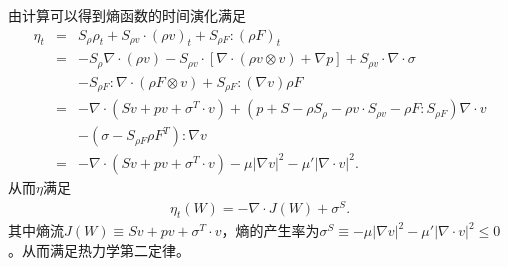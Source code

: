 \documentclass{article}
\begin{document}
由计算可以得到熵函数的时间演化满足
\begin{eqnarray}\label{eq:entropy}
  \eta_t  &=& S_\rho \rho_t + S_{\rho  v } \cdot (\rho  v )_t  + S_{\rho F} : (\rho F)_t \nonumber \\
  &=& -S_{\rho} \nabla \cdot (\rho  v )  - S_{\rho  v  } \cdot [\nabla \cdot (\rho  v \otimes v ) + \nabla p] + S_{\rho  v } \cdot \nabla \cdot \sigma \nonumber \\
    &&- S_{\rho F} : \nabla \cdot (\rho F\otimes  v  ) + S_{\rho F}:(\nabla   v ) \rho F \nonumber \\
    &=& - \nabla \cdot (S  v +p  v  +\sigma^T \cdot v ) + (p+S - \rho S_\rho - \rho  v  \cdot S_{\rho  v } - \rho F : S_{\rho F}) \nabla \cdot  v  \nonumber \\
    &&- (\sigma - S_{\rho F} \rho F^T) : \nabla  v \nonumber \\
    &=& - \nabla \cdot (S  v +p  v  +\sigma^T \cdot v ) - \mu|\nabla  v |^2 - \mu'|\nabla\cdot v |^2.
\end{eqnarray}
从而$\eta$满足
\begin{eqnarray}\label{eq:entropyvol}
  \eta_t(W) = -\nabla\cdot J(W) + \sigma^S.
\end{eqnarray}
其中熵流$J(W)\equiv S  v +p  v  +\sigma^T \cdot v $，熵的产生率为$\sigma^S \equiv - \mu|\nabla  v |^2 - \mu'|\nabla\cdot v |^2 \le 0$。从而满足热力学第二定律。
\end{document}
